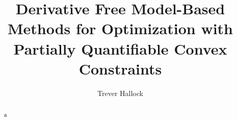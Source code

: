 \documentclass{article}
\title{Derivative Free Model-Based Methods for Optimization with Partially Quantifiable Convex Constraints}
\author{Trever Hallock}
\begin{document}
\maketitle

\begin{abstract}
a
\end{abstract}

\newpage

\tableofcontents

\newpage


\end{document}
